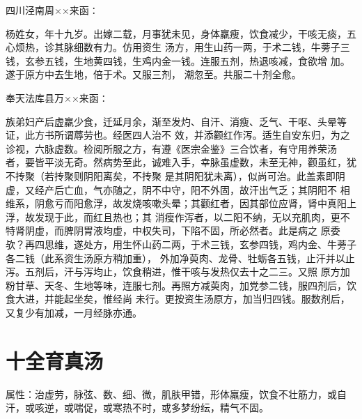 \documentclass[a4paper,12pt,UTF8,twoside]{ctexbook}
\begin{document}
四川泾南周××来函∶ 

杨姓女，年十九岁。出嫁二载，月事犹未见，身体羸瘦，饮食减少，干咳无痰，五心烦热，诊其脉细数有力。仿用资生 
汤方，用生山药一两，于术二钱，牛蒡子三钱，玄参五钱，生地黄四钱，生鸡内金一钱。连服五剂，热退咳减，食欲增 
加。遂于原方中去生地，倍于术。又服三剂， 潮忽至。共服二十剂全愈。 

奉天法库县万××来函∶ 

族弟妇产后虚羸少食，迁延月余，渐至发灼、自汗、消瘦、乏气、干呕、头晕等证，此方书所谓蓐劳也。经医四人治不 
效，并添颧红作泻。适生自安东归，为之诊视，六脉虚数。检阅所服之方，有遵《医宗金鉴》三合饮者，有守用养荣汤 
者，要皆平淡无奇。然病势至此，诚难入手，幸脉虽虚数，未至无神，颧虽红，犹不抟聚（若抟聚则阴阳离矣，不抟聚 
是其阴阳犹未离），似尚可治。此盖素即阴虚，又经产后亡血，气亦随之，阴不中守，阳不外固，故汗出气乏；其阴阳不 
相维系，阴愈亏而阳愈浮，故发烧咳嗽头晕；其颧红者，因其部位应肾，肾中真阳上浮，故发现于此，而红且热也；其 
消瘦作泻者，以二阳不纳，无以充肌肉，更不特肾阴虚，而脾阴胃液均虚，中权失司，下陷不固，所必然者。此是病之 
原委欤？再四思维，遂处方，用生怀山药二两，于术三钱，玄参四钱，鸡内金、牛蒡子各二钱（此系资生汤原方稍加重）， 
外加净萸肉、龙骨、牡蛎各五钱，止汗并以止泻。五剂后，汗与泻均止，饮食稍进，惟干咳与发热仅去十之二三。又照 
原方加粉甘草、天冬、生地等味，连服七剂。再照方减萸肉，加党参二钱，服四剂后，饮食大进，并能起坐矣，惟经尚 
未行。更按资生汤原方，加当归四钱。服数剂后，又复少有加减，一月经脉亦通。 

\section{十全育真汤}
属性：治虚劳，脉弦、数、细、微，肌肤甲错，形体羸瘦，饮食不壮筋力，或自汗，或咳逆，或喘促，或寒热不时，或多梦纷纭，精气不固。
\end{document}
